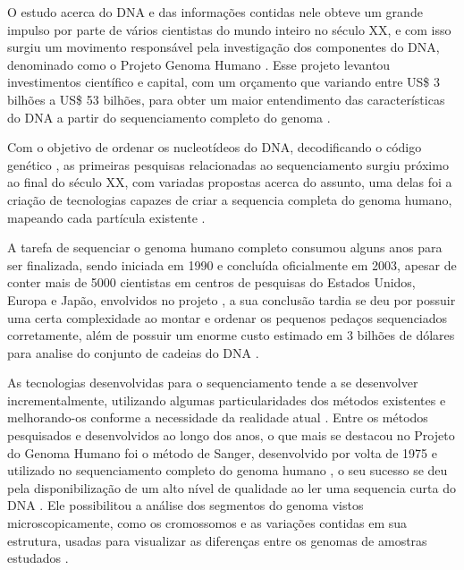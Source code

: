 O estudo acerca do DNA e das informações contidas nele obteve um grande impulso por parte de vários cientistas do mundo inteiro no século XX, e com isso surgiu um movimento responsável pela investigação dos componentes do DNA, denominado como o Projeto Genoma Humano \cite{Lander2001}. Esse projeto levantou investimentos científico e capital, com um orçamento que variando entre US\$ 3 bilhões a US\$ 53 bilhões, para obter um maior entendimento das características do DNA a partir do sequenciamento completo do genoma \cite{Marian2011}. 

Com o objetivo de ordenar os nucleotídeos do DNA, decodificando o código genético \cite{Edwards2011}, as primeiras pesquisas relacionadas ao sequenciamento surgiu próximo ao final do século XX, com variadas propostas acerca do assunto, uma delas foi a criação de tecnologias capazes de criar a sequencia completa do genoma humano, mapeando cada partícula existente \cite{Lander2001,HutchisonIII2007}. 

A tarefa de sequenciar o genoma humano completo consumou alguns anos para ser finalizada, sendo iniciada em 1990 e concluída oficialmente em 2003, apesar de conter mais de 5000 cientistas em centros de pesquisas do Estados Unidos, Europa e Japão, envolvidos no projeto \cite{HutchisonIII2007}, a sua conclusão tardia se deu por possuir uma certa complexidade ao montar e ordenar os pequenos pedaços sequenciados corretamente, além de possuir um enorme custo estimado em 3 bilhões de dólares para analise do conjunto de cadeias do DNA \cite{Rye2017,HutchisonIII2007}.

As tecnologias desenvolvidas para o sequenciamento tende a se desenvolver incrementalmente, utilizando algumas particularidades dos métodos existentes e melhorando-os conforme a necessidade da realidade atual \cite{HutchisonIII2007}. Entre os métodos pesquisados e desenvolvidos ao longo dos anos, o que mais se destacou no Projeto do Genoma Humano foi o método de Sanger, desenvolvido por volta de 1975 \cite{Sanger1975} e utilizado no sequenciamento completo do genoma humano \cite{HutchisonIII2007}, o seu sucesso se deu pela disponibilização de um alto nível de qualidade ao ler uma sequencia curta do DNA \cite{Edwards2011}. Ele possibilitou a análise dos segmentos do genoma vistos microscopicamente, como os cromossomos e as variações contidas em sua estrutura, usadas para visualizar as diferenças entre os genomas de amostras estudados \cite{Feuk2006,Sanger1975}. 

